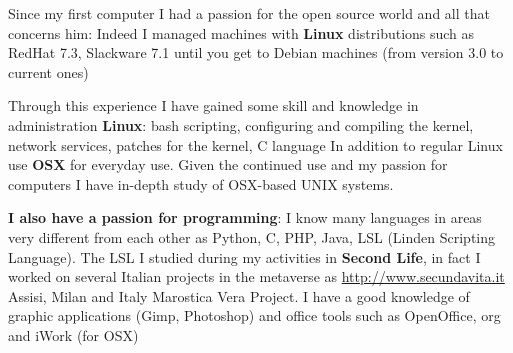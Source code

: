 \documentclass[totpages,helvetica,openbib,english]{europecv}
\begin{document}
\begin{europecv}
{Since my first computer I had a passion for the open source world and all that concerns him: Indeed I managed machines with \textbf{Linux} distributions such as RedHat 7.3, Slackware 7.1 until you get to Debian machines (from version 3.0 to current ones)

Through this experience I have gained some skill and knowledge in administration \textbf{Linux}: bash scripting, configuring and compiling the kernel, network services, patches for the kernel, C language In addition to regular Linux use \textbf{OSX} for everyday use. Given the continued use and my passion for computers I have in-depth study of OSX-based UNIX systems.

\textbf{I also have a passion for programming}: I know many languages in areas very different from each other as Python, C, PHP, Java, LSL (Linden Scripting Language). The LSL I studied during my activities in \textbf{Second Life}, in fact I worked on several Italian projects in the metaverse as \url{http://www.secundavita.it} Assisi, Milan and Italy Marostica Vera Project.
I have a good knowledge of graphic applications (Gimp, Photoshop) and office tools such as OpenOffice, org and iWork (for OSX)}




\end{europecv}
\end{document}
